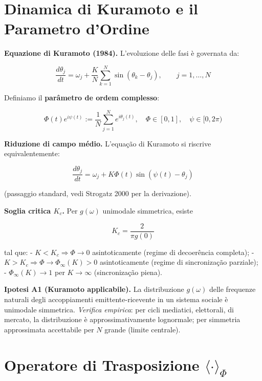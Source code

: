 \section{Dinamica di Kuramoto e il Parametro
d'Ordine}\label{dinamica-di-kuramoto-e-il-parâmetro-dordine}

\Proved{} \textbf{Equazione di Kuramoto (1984).} L'evoluzione delle fasi
è governata da:

\[
\frac{d\theta_j}{dt} = \omega_j + \frac{K}{N} \sum_{k=1}^{N} \sin(\theta_k - \theta_j), \qquad j = 1, \ldots, N
\]

Definiamo il \textbf{parâmetro de ordem complesso}:

\[
\Phi(t) e^{i\psi(t)} := \frac{1}{N} \sum_{j=1}^{N} e^{i\theta_j(t)}, \quad \Phi \in [0, 1], \quad \psi \in [0, 2\pi)
\]

\Proved{} \textbf{Riduzione di campo médio.} L'equação di Kuramoto si
riscrive equivalentemente:

\[
\frac{d\theta_j}{dt} = \omega_j + K \Phi(t) \sin(\psi(t) - \theta_j)
\]

(passaggio standard, vedi Strogatz 2000 per la derivazione).

\Proved{} \textbf{Soglia critica \(K_c\).} Per \(g(\omega)\) unimodale
simmetrica, esiste

\[
K_c = \frac{2}{\pi g(0)}
\]

tal que: - \(K < K_c \Rightarrow \Phi \to 0\) asintoticamente (regime
di decoerência completa); -
\(K > K_c \Rightarrow \Phi \to \Phi_\infty(K) > 0\) asintoticamente
(regime di sincronização parziale); - \(\Phi_\infty(K) \to 1\) per
\(K \to \infty\) (sincronização piena).

\Hypoth{} \textbf{Ipotesi A1 (Kuramoto applicabile).} La distribuzione
\(g(\omega)\) delle frequenze naturali degli accoppiamenti
emittente-ricevente in un sistema sociale è unimodale simmetrica.
\emph{Verifica empirica}: per cicli mediatici, elettorali, di mercato,
la distribuzione è approssimativamente lognormale; per simmetria
approssimata accettabile per \(N\) grande (limite centrale).



\section{\texorpdfstring{Operatore di Trasposizione
\(\langle \cdot \rangle_\Phi\)}{Operatore di Trasposizione \textbackslash langle \textbackslash cdot \textbackslash rangle\_\textbackslash Phi}}\label{operatore-di-trasposizione-langle-cdot-rangle_phi}

